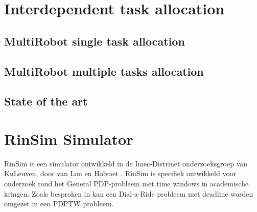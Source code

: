 \section{Interdependent task allocation}
\subsection{MultiRobot single task allocation}
\subsection{MultiRobot multiple tasks allocation}
\subsection{State of the art}


\section{RinSim Simulator}
RinSim is een simulator ontwikkeld in de Imec-Distrinet onderzoeksgroep van KuLeuven, door van Lon en Holvoet \cite{vanLon2012saso}. RinSim is specifiek ontwikkeld voor onderzoek rond het General PDP-probleem met time windows in academische kringen. Zoals besproken in \cite{DAR-WD} kan een Dial-a-Ride probleem met deadline worden omgezet in een PDPTW probleem.\\

